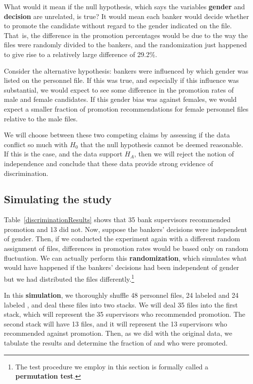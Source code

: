 What would it mean if the null hypothesis, which says the variables \textbf{gender} and \textbf{decision} are unrelated, is true? It would mean each banker would decide whether to promote the candidate without regard to the gender indicated on the file. That~is, the difference in the promotion percentages would be due to the way the files were randomly divided to the bankers, and the randomization just happened to give rise to a relatively large difference of 29.2\%.

Consider the alternative hypothesis: bankers were influenced by which gender was listed on the personnel file. If this was true, and especially if this influence was substantial, we would expect to see some difference in the promotion rates of male and female candidates. If this gender bias was against females, we would expect a smaller fraction of promotion recommendations for female personnel files relative to the male files.

We will choose between these two competing claims by assessing if the data conflict so much with $H_0$ that the null hypothesis cannot be deemed reasonable. If this is the case, and the data support $H_A$, then we will reject the notion of independence and conclude that these data provide strong evidence of discrimination.

\subsection{Simulating the study}
\label{simulatingTheStudy}

Table~\ref{discriminationResults} shows that 35 bank supervisors recommended promotion and 13 did not. Now, suppose the bankers' decisions were independent of gender. Then, if we conducted the experiment again with a different random assignment of files, differences in promotion rates would be based only on random fluctuation. We can actually perform this \textbf{randomization}, which simulates what would have happened if the bankers' decisions had been independent of gender but we had distributed the files differently.\footnote{The test procedure we employ in this section is formally called a \textbf{permutation test}.}

In this \textbf{simulation}, we thoroughly shuffle 48 personnel files, 24 labeled  and 24 labeled , and deal these files into two stacks. We will deal 35 files into the first stack, which will represent the 35 supervisors who recommended promotion. The second stack will have 13 files, and it will represent the 13 supervisors who recommended against promotion. Then, as we did with the original data, we tabulate the results and determine the fraction of  and  who were promoted.

